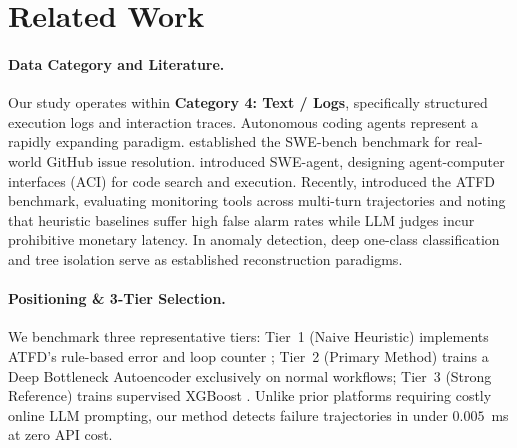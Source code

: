 \documentclass[11pt]{article}
\begin{document}
\section{Related Work}
\paragraph{Data Category and Literature.}
Our study operates within \textbf{Category 4: Text / Logs}, specifically structured execution logs and interaction traces. Autonomous coding agents represent a rapidly expanding paradigm. \citet{jimenez2024swebench} established the SWE-bench benchmark for real-world GitHub issue resolution. \citet{yang2024sweagent} introduced SWE-agent, designing agent-computer interfaces (ACI) for code search and execution. Recently, \citet{galea2026atfd} introduced the ATFD benchmark, evaluating monitoring tools across multi-turn trajectories and noting that heuristic baselines suffer high false alarm rates while LLM judges incur prohibitive monetary latency. In anomaly detection, deep one-class classification \citep{ruff2018deepsvdd} and tree isolation \citep{liu2008isolationforest} serve as established reconstruction paradigms.

\begin{table}[t]
\centering
\small
{}
\caption{Positioning comparison against literature monitoring methods on agent trajectories.}
\label{tab:related_work}
\end{table}

\paragraph{Positioning \& 3-Tier Selection.}
We benchmark three representative tiers: Tier~1 (Naive Heuristic) implements ATFD's rule-based error and loop counter \citep{galea2026atfd}; Tier~2 (Primary Method) trains a Deep Bottleneck Autoencoder exclusively on normal workflows; Tier~3 (Strong Reference) trains supervised XGBoost \citep{chen2016xgboost}. Unlike prior platforms requiring costly online LLM prompting, our method detects failure trajectories in under $0.005$~ms at zero API cost.
\end{document}
